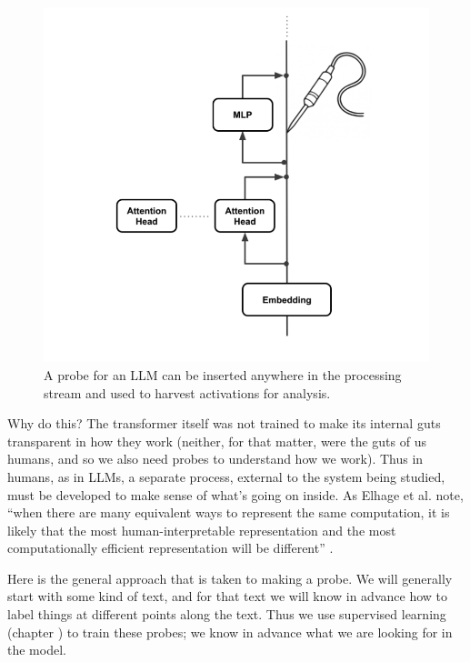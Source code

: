 \begin{figure}[h]
\centering
\includegraphics[scale=.5]{./images/linearProbe.png}
\caption[Jeff Yoshimi; the line art for the probe was generated by ChatGPT.]{A probe for an LLM can be inserted anywhere in the processing stream and used to harvest activations for analysis.}
\label{linearProbe}
\end{figure}

Why do this? The transformer itself was not trained to make its internal guts transparent in how they work (neither, for that matter, were the guts of us humans, and so we also need probes to understand how we work). Thus in humans, as in LLMs, a separate process, external to the system being studied, must be developed to make sense of what’s going on inside. As Elhage et al. note, ``when there are many equivalent ways to represent the same computation, it is likely that the most human-interpretable representation and the most computationally efficient representation will be different'' \cite{elhage2021mathematical}.

Here is the general approach that is taken to making a probe. We will generally start with some kind of text, and for that text we will know in advance how to label things at different points along the text. Thus we use supervised learning (chapter ) to train these probes; we know in advance what we are looking for in the model.

